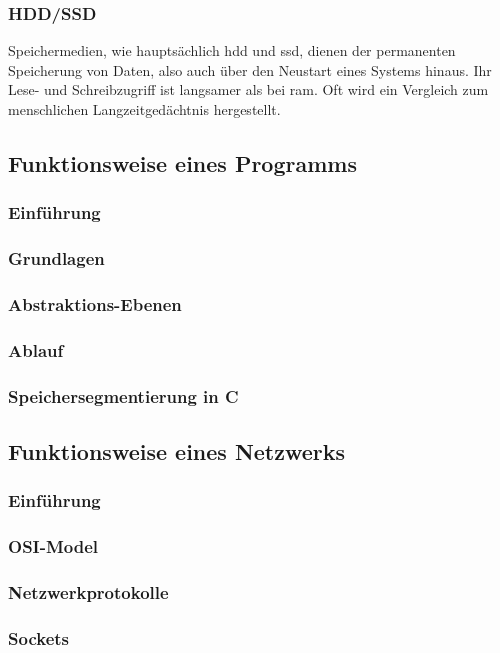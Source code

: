 \documentclass[11pt, a4paper]{article}
\begin{document}
\subsubsection{HDD/SSD}
Speichermedien, wie hauptsächlich \gls{hdd} und \gls{ssd}, dienen der permanenten Speicherung von Daten, also auch über den Neustart eines Systems hinaus. Ihr Lese- und Schreibzugriff ist langsamer als bei \gls{ram}. Oft wird ein Vergleich zum menschlichen Langzeitgedächtnis hergestellt. 

\subsection{Funktionsweise eines Programms}\label{funktionsweise-eines-programmes}

\subsubsection{Einführung}
\subsubsection{Grundlagen}
\subsubsection{Abstraktions-Ebenen}
\subsubsection{Ablauf}
\subsubsection{Speichersegmentierung in C}

\subsection{Funktionsweise eines Netzwerks}
\subsubsection{Einführung}
\subsubsection{OSI-Model}
\subsubsection{Netzwerkprotokolle}
\subsubsection{Sockets}
\end{document}
